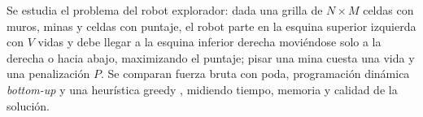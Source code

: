 Se estudia el problema del robot explorador: dada una grilla de $N\times M$ celdas con muros, minas y celdas con puntaje, el robot parte en la esquina superior izquierda con $V$ vidas y debe llegar a la esquina inferior derecha moviéndose solo a la derecha o hacia abajo, maximizando el puntaje; pisar una mina cuesta una vida y una penalización $P$. Se comparan fuerza bruta con poda, programación dinámica \textit{bottom-up} \cite{cormen} y una heurística greedy \cite{algorithms_erickson}, midiendo tiempo, memoria y calidad de la solución.
